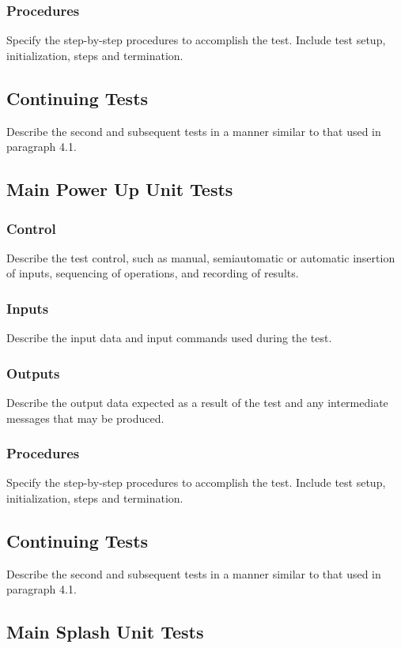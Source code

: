 \documentclass[11pt, oneside]{article}   	%
\begin{document}
\subsubsection{Procedures}
Specify the step-by-step procedures to accomplish the test. Include test setup, initialization, steps and termination.

\subsection{Continuing Tests}
Describe the second and subsequent tests in a manner similar to that used in paragraph 4.1.

\subsection{Main Power Up Unit Tests}
\subsubsection{Control}
Describe the test control, such as manual, semiautomatic or automatic insertion of inputs, sequencing of operations, and recording of results.

\subsubsection{Inputs}
Describe the input data and input commands used during the test.

\subsubsection{Outputs}
Describe the output data expected as a result of the test and any intermediate messages that may be produced.

\subsubsection{Procedures}
Specify the step-by-step procedures to accomplish the test. Include test setup, initialization, steps and termination.

\subsection{Continuing Tests}
Describe the second and subsequent tests in a manner similar to that used in paragraph 4.1.

\subsection{Main Splash Unit Tests}
\end{document}
